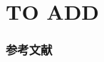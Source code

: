 


\section{TO ADD}


\begin{frame}


\end{frame}



\begin{frame}
\frametitle{参考文献}



\end{frame}








